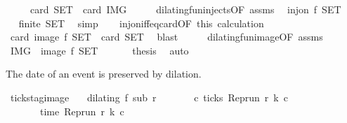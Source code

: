 \begin{isabellebody}
\ \ \ \ {\isacharparenleft}\ {\isacartoucheopen}card\ {\isacharquery}SET\ {\isacharequal}\ card\ {\isacharquery}IMG{\isacartoucheclose}{\isacharparenright}\isanewline
%
\isadelimproof
%
\endisadelimproof
%
\isatagproof
{}\isamarkupfalse%
\ {\isacharminus}\isanewline
\ \ \isamarkupfalse%
\ dilating{\isacharunderscore}fun{\isacharunderscore}injects{\isacharbrackleft}OF\ assms{\isacharbrackright}\ \isamarkupfalse%
\ {\isacartoucheopen}inj{\isacharunderscore}on\ f\ {\isacharquery}SET{\isacartoucheclose}\ \isacommand{{\isachardot}}\isamarkupfalse%
\isanewline
\ \ \isamarkupfalse%
\ \isamarkupfalse%
\ {\isacartoucheopen}finite\ {\isacharquery}SET{\isacartoucheclose}\ \isamarkupfalse%
\ simp\isanewline
\ \ \isamarkupfalse%
\ inj{\isacharunderscore}on{\isacharunderscore}iff{\isacharunderscore}eq{\isacharunderscore}card{\isacharbrackleft}OF\ this{\isacharbrackright}\ calculation\isanewline
\ \ \ \ \isamarkupfalse%
\ {\isacartoucheopen}card\ {\isacharparenleft}image\ f\ {\isacharquery}SET{\isacharparenright}\ {\isacharequal}\ card\ {\isacharquery}SET{\isacartoucheclose}\ \isamarkupfalse%
\ blast\isanewline
\ \ \isamarkupfalse%
\ \isamarkupfalse%
\ dilating{\isacharunderscore}fun{\isacharunderscore}image{\isacharbrackleft}OF\ assms{\isacharbrackright}\ \isamarkupfalse%
\ {\isacartoucheopen}{\isacharquery}IMG\ {\isacharequal}\ image\ f\ {\isacharquery}SET{\isacartoucheclose}\ \isacommand{{\isachardot}}\isamarkupfalse%
\isanewline
\ \ \isamarkupfalse%
\ \isamarkupfalse%
\ {\isacharquery}thesis\ \isamarkupfalse%
\ auto\isanewline
{}\isamarkupfalse%
%
\endisatagproof
{\isafoldproof}%
%
\isadelimproof
%
\endisadelimproof
%
\begin{isamarkuptext}%
The date of an event is preserved by dilation.%
\end{isamarkuptext}\isamarkuptrue%
\isamarkupfalse%
\ ticks{\isacharunderscore}tag{\isacharunderscore}image{\isacharcolon}\isanewline
\ \ \ {\isacartoucheopen}dilating\ f\ sub\ r{\isacartoucheclose}\isanewline
\ \ \ \ \ \ \ {\isacartoucheopen}{\isasymexists}c{\isachardot}\ ticks\ {\isacharparenleft}{\isacharparenleft}Rep{\isacharunderscore}run\ r{\isacharparenright}\ k\ c{\isacharparenright}{\isacartoucheclose}\isanewline
\ \ \ \ \ \ \ {\isacartoucheopen}time\ {\isacharparenleft}{\isacharparenleft}Rep{\isacharunderscore}run\ r{\isacharparenright}\ k\ c{\isacharparenright}\ {\isacharequal}\ {\isasymtau}{\isacartoucheclose}\isanewline

\end{isabellebody}

